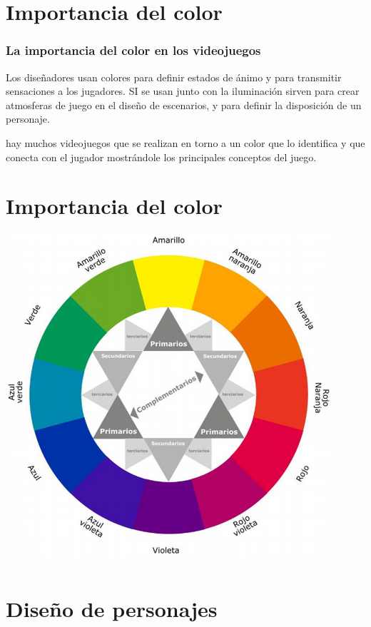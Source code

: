 \documentclass[11pt]{beamer}
\begin{document}
\section{Importancia del color}
\begin{frame}
\frametitle{La importancia del color en los videojuegos}
Los diseñadores usan colores para definir estados de ánimo y para transmitir sensaciones a los jugadores. SI se usan junto con la iluminación sirven para crear atmosferas de juego en el diseño de escenarios, y para definir la disposición de un personaje.

hay muchos videojuegos que se realizan en torno a un color que lo identifica y que conecta con el jugador mostrándole los principales conceptos del juego.

\end{frame}
\section{Importancia del color}
\begin{frame}

\begin{center}
 \includegraphics[scale=0.7,keepaspectratio=true]{img/colorgama.png}
\end{center}

\end{frame}
\section{Diseño de personajes}
\end{document}
